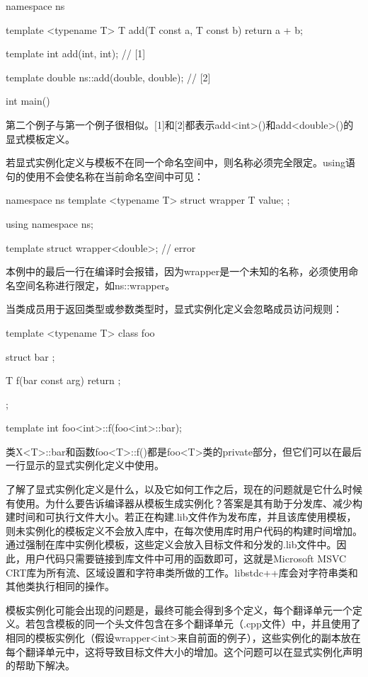 \begin{cppcode}
namespace ns
{
	template <typename T>
	T add(T const a, T const b)
	{
		return a + b;
	}

	template int add(int, int); // [1]
}

template double ns::add(double, double); // [2]

int main() { }
\end{cppcode}

第二个例子与第一个例子很相似。[1]和[2]都表示add<int>()和add<double>()的显式模板定义。

若显式实例化定义与模板不在同一个命名空间中，则名称必须完全限定。using语句的使用不会使名称在当前命名空间中可见：

\begin{cppcode}
namespace ns
{
	template <typename T>
	struct wrapper { T value; };
}

using namespace ns;

template struct wrapper<double>; // error
\end{cppcode}

本例中的最后一行在编译时会报错，因为wrapper是一个未知的名称，必须使用命名空间名称进行限定，如ns::wrapper。

当类成员用于返回类型或参数类型时，显式实例化定义会忽略成员访问规则：

\begin{cppcode}
template <typename T>
class foo
{
	struct bar {};
	
	T f(bar const arg)
	{
		return {};
	}
};

template int foo<int>::f(foo<int>::bar);
\end{cppcode}

类X<T>::bar和函数foo<T>::f()都是foo<T>类的private部分，但它们可以在最后一行显示的显式实例化定义中使用。

了解了显式实例化定义是什么，以及它如何工作之后，现在的问题就是它什么时候有使用。为什么要告诉编译器从模板生成实例化？答案是其有助于分发库、减少构建时间和可执行文件大小。若正在构建.lib文件作为发布库，并且该库使用模板，则未实例化的模板定义不会放入库中，在每次使用库时用户代码的构建时间增加。通过强制在库中实例化模板，这些定义会放入目标文件和分发的.lib文件中。因此，用户代码只需要链接到库文件中可用的函数即可，这就是Microsoft MSVC CRT库为所有流、区域设置和字符串类所做的工作。libstdc++库会对字符串类和其他类执行相同的操作。

模板实例化可能会出现的问题是，最终可能会得到多个定义，每个翻译单元一个定义。若包含模板的同一个头文件包含在多个翻译单元（.cpp文件）中，并且使用了相同的模板实例化（假设wrapper<int>来自前面的例子），这些实例化的副本放在每个翻译单元中，这将导致目标文件大小的增加。这个问题可以在显式实例化声明的帮助下解决。

